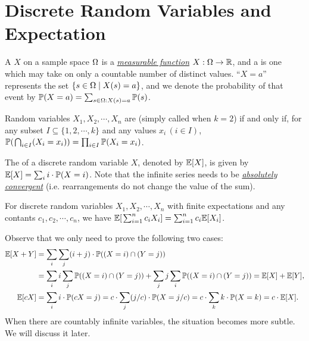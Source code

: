 \documentclass[main.tex]{subfiles}
\begin{document}
\minispacing

\section{Discrete Random Variables and Expectation}

A  $X$ on a sample space $\Omega$ is a \href{https://en.wikipedia.org/wiki/Measurable_function}{\it measurable function} $X:\Omega \rightarrow \mathbb{R}$, and a  is one which may take on only a countable number of distinct values. ``$X=a$'' represents the set $\{s \in \Omega \mid X(s) = a\}$, and we denote the probability of that event by $\mathbb{P}(X=a)=\sum_{s\in\Omega:X(s)=a}\mathbb{P}(s)$.

Random variables $X_1,X_2,\cdots,X_n$ are  (simply called  when $k=2$) if and only if, for any subset $I \subseteq \{1,2,\cdots,k\}$ and any values $x_i\,(i\in I)$, $\mathbb{P}(\;\!\bigcap_{i\in I}(X_i=x_i))=\prod_{i\in I}\mathbb{P}(X_i=x_i)$.

The  of a discrete random variable $X$, denoted by $\mathbb{E}[X]$, is given by $\mathbb{E}[X]=\sum_{i} i \cdot \mathbb{P}(X=i)$. Note that the infinite series needs to be \href{https://en.wikipedia.org/wiki/Absolute_convergence}{\it absolutely convergent} (i.e. rearrangements do not change the value of the sum).

\begin{theorem}
	For discrete random variables $X_1,X_2,\cdots,X_n$ with finite expectations and any contants $c_1,c_2,\cdots,c_n$,
	we have $\mathbb{E}[\;\!\sum_{i=1}^{n}c_iX_i]=\sum_{i=1}^{n}c_i\mathbb{E}[X_i]$.
\end{theorem}

\begin{pf}
	Observe that we only need to prove the following two cases:
	\begin{equation*}
		\begin{split}
			\mathbb{E}[X+Y]&=\sum_i\sum_j(i+j)\cdot\mathbb{P}((X=i)\cap(Y=j))\\
			&=\sum_ii\sum_j\mathbb{P}((X=i)\cap(Y=j))+\sum_jj\sum_i\mathbb{P}((X=i)\cap(Y=j))=\mathbb{E}[X]+\mathbb{E}[Y], \\
			\mathbb{E}[cX]&=\sum_ii\cdot\mathbb{P}(cX=j)=c\cdot\sum_j(j/c)\cdot\mathbb{P}(X=j/c)=c\cdot\sum_kk\cdot\mathbb{P}(X=k)=c\cdot \mathbb{E}[X].
		\end{split}
	\end{equation*}
	When there are countably infinite variables, the situation becomes more subtle. We will discuss it later.
\end{pf}
\end{document}
